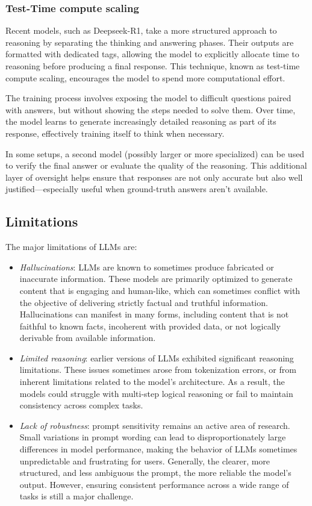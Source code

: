 \subsubsection{Test-Time compute scaling}
Recent models, such as Deepseek-R1, take a more structured approach to reasoning by separating the thinking and answering phases. 
Their outputs are formatted with dedicated tags, allowing the model to explicitly allocate time to reasoning before producing a final response.
This technique, known as test-time compute scaling, encourages the model to spend more computational effort. 

The training process involves exposing the model to difficult questions paired with answers, but without showing the steps needed to solve them. 
Over time, the model learns to generate increasingly detailed reasoning as part of its response, effectively training itself to think when necessary.

In some setups, a second model (possibly larger or more specialized) can be used to verify the final answer or evaluate the quality of the reasoning. 
This additional layer of oversight helps ensure that responses are not only accurate but also well justified—especially useful when ground-truth answers aren't available.

\subsection{Limitations}
The major limitations of LLMs are: 
\begin{itemize}
    \item \textit{Hallucinations}: LLMs are known to sometimes produce fabricated or inaccurate information. 
        These models are primarily optimized to generate content that is engaging and human-like, which can sometimes conflict with the objective of delivering strictly factual and truthful information.
        Hallucinations can manifest in many forms, including content that is not faithful to known facts, incoherent with provided data, or not logically derivable from available information.
    \item \textit{Limited reasoning}: earlier versions of LLMs exhibited significant reasoning limitations. 
        These issues sometimes arose from tokenization errors, or from inherent limitations related to the model's architecture. 
        As a result, the models could struggle with multi-step logical reasoning or fail to maintain consistency across complex tasks.
    \item \textit{Lack of robustness}: prompt sensitivity remains an active area of research. 
        Small variations in prompt wording can lead to disproportionately large differences in model performance, making the behavior of LLMs sometimes unpredictable and frustrating for users.
        Generally, the clearer, more structured, and less ambiguous the prompt, the more reliable the model's output. 
        However, ensuring consistent performance across a wide range of tasks is still a major challenge.
\end{itemize}